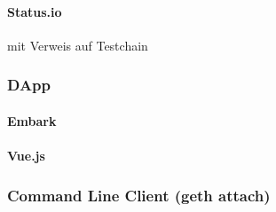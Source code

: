 \paragraph{Status.io}
mit Verweis auf Testchain

\subsubsection{DApp}
\paragraph{Embark}
\paragraph{Vue.js}

\subsubsection{Command Line Client (geth attach)}


\section{}
